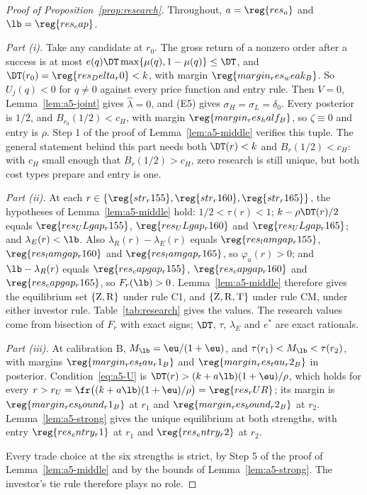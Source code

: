 \begin{proof}[Proof of Proposition~\ref{prop:research}]
Throughout, \(a=\reg{res_a}\) and \(\lb=\reg{res_cap}\).

\emph{Part (i).} Take any candidate at \(r_0\). The gross return of a nonzero order after a success is at most
\(e(q)\DT\max\{\mu(q),1-\mu(q)\}\le\DT\), and \(\DT(r_0)=\reg{res_Delta_r0}<k\), with margin
\(\reg{margin_res_weak_B}\). So \(U_j(q)<0\) for \(q\ne0\) against every price function and entry rule. Then
\(V=0\), Lemma~\ref{lem:a5-joint} gives \(\hat\lambda=0\), and (E5) gives \(\sigma_H=\sigma_L=\delta_0\). Every
posterior is \(1/2\), and \(B_{r_0}(1/2)<c_H\), with margin \(\reg{margin_res_half_B}\), so \(\zeta\equiv0\) and entry
is \(\rho\). Step 1 of the proof of Lemma~\ref{lem:a5-middle} verifies this tuple. The general statement behind this
part needs both \(\DT(r)<k\) and \(B_r(1/2)<c_H\): with \(c_H\) small enough that \(B_r(1/2)>c_H\), zero research is
still unique, but both cost types prepare and entry is one.

\emph{Part (ii).} At each \(r\in\{\reg{str_r155},\reg{str_r160},\reg{str_r165}\}\), the hypotheses of
Lemma~\ref{lem:a5-middle} hold: \(1/2<\tau(r)<1\); \(k-\rho\DT(r)/2\) equals \(\reg{res_ULgap_r155}\),
\(\reg{res_ULgap_r160}\) and \(\reg{res_ULgap_r165}\); and \(\lambda_E(r)<\lb\). Also \(\lambda_R(r)-\lambda_E(r)\)
equals \(\reg{res_lamgap_r155}\), \(\reg{res_lamgap_r160}\) and \(\reg{res_lamgap_r165}\), so \(\varphi_a(r)>0\); and
\(\lb-\lambda_R(r)\) equals \(\reg{res_capgap_r155}\), \(\reg{res_capgap_r160}\) and \(\reg{res_capgap_r165}\), so
\(F_r(\lb)>0\). Lemma~\ref{lem:a5-middle} therefore gives the equilibrium set \(\{{\rm Z},{\rm R}\}\) under rule C1,
and \(\{{\rm Z},{\rm R},{\rm T}\}\) under rule CM, under either investor rule. Table~\ref{tab:research} gives the
values. The research values come from bisection of \(F_r\) with exact signs; \(\DT\), \(\tau\), \(\lambda_E\) and
\(e^*\) are exact rationals.

\emph{Part (iii).} At calibration B, \(M_{\lb}=\eu/(1+\eu)\), and \(\tau(r_1)<M_{\lb}<\tau(r_2)\), with margins
\(\reg{margin_res_tau_r1_B}\) and \(\reg{margin_res_tau_r2_B}\) in posterior. Condition~\eqref{eq:a5-U} is
\(\DT(r)>(k+a\lb)(1+\eu)/\rho\), which holds for every \(r>r_U=\fr\bigl((k+a\lb)(1+\eu)/\rho\bigr)=\reg{res_rUR}\);
its margin is \(\reg{margin_res_bound_r1_B}\) at \(r_1\) and \(\reg{margin_res_bound_r2_B}\) at \(r_2\).
Lemma~\ref{lem:a5-strong} gives the unique equilibrium at both strengths, with entry \(\reg{res_entry_r1}\) at
\(r_1\) and \(\reg{res_entry_r2}\) at \(r_2\).

Every trade choice at the six strengths is strict, by Step 5 of the proof of Lemma~\ref{lem:a5-middle} and by the
bounds of Lemma~\ref{lem:a5-strong}. The investor's tie rule therefore plays no role.
\end{proof}

